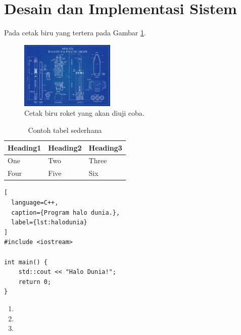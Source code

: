 \section{Desain dan Implementasi Sistem}
\label{sec:desainimplementasi}


Pada cetak biru yang tertera pada Gambar \ref{fig:cetakbiru}. \lipsum[8]

\begin{figure} [ht]
  \centering
  \includegraphics[width=0.4\textwidth]{gambar/cetakbiru.jpg}

  \caption{Cetak biru roket yang akan diuji coba. \cite{cetakbiruspacex}}
  \label{fig:cetakbiru}
\end{figure}

\lipsum[9-11]

\begin{table}
  \caption{Contoh tabel sederhana}
  \label{tab:tabelsederhana}
  \centering
  \begin{tabular}{lll}
    \toprule
    Heading1 & Heading2 & Heading3  \\
    \midrule
    One      & Two      & Three     \\
    Four     & Five     & Six       \\
    \bottomrule
  \end{tabular}
\end{table}

\begin{lstlisting}[
  language=C++,
  caption={Program halo dunia.},
  label={lst:halodunia}
]
#include <iostream>

int main() {
    std::cout << "Halo Dunia!";
    return 0;
}
\end{lstlisting}

\lipsum[12]

\begin{enumerate}
  \item \lipsum[13][1-4]
  \item \lipsum[13][5-8]
  \item \lipsum[13][9-12]
\end{enumerate}

\lipsum[14-15]
